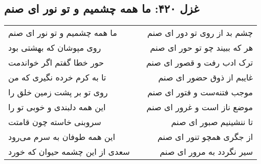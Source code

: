 \begin{center}
\section*{غزل ۴۲۰: ما همه چشمیم و تو نور ای صنم}
\label{sec:420}
\begin{longtable}{l p{0.5cm} r}
ما همه چشمیم و تو نور ای صنم
&&
چشم بد از روی تو دور ای صنم
\\
روی مپوشان که بهشتی بود
&&
هر که ببیند چو تو حور ای صنم
\\
حور خطا گفتم اگر خواندمت
&&
ترک ادب رفت و قصور ای صنم
\\
تا به کرم خرده نگیری که من
&&
غایبم از ذوق حضور ای صنم
\\
روی تو بر پشت زمین خلق را
&&
موجب فتنه‌ست و فتور ای صنم
\\
این همه دلبندی و خوبی تو را
&&
موضع ناز است و غرور ای صنم
\\
سروبنی خاسته چون قامتت
&&
تا ننشینیم صبور ای صنم
\\
این همه طوفان به سرم می‌رود
&&
از جگری همچو تنور ای صنم
\\
سعدی از این چشمه حیوان که خورد
&&
سیر نگردد به مرور ای صنم
\\
\end{longtable}
\end{center}
